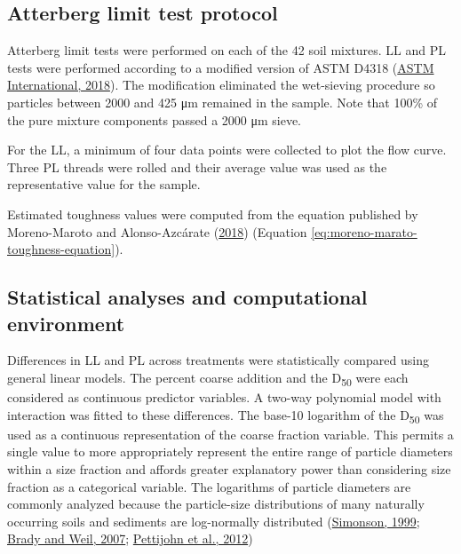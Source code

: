 \documentclass[
  letterpaper,
]{article}
\begin{document}
\hypertarget{atterberg-limit-test-protocol}{%
\subsection{Atterberg limit test protocol}\label{atterberg-limit-test-protocol}}

Atterberg limit tests were performed on each of the 42 soil mixtures.
LL and PL tests were performed according to a modified version of ASTM D4318 (\protect\hyperlink{ref-ASTMD43182018}{ASTM International, 2018}).
The modification eliminated the wet-sieving procedure so particles between 2000 and 425 μm remained in the sample.
Note that 100\% of the pure mixture components passed a 2000 μm sieve.

For the LL, a minimum of four data points were collected to plot the flow curve.
Three PL threads were rolled and their average value was used as the representative value for the sample.

Estimated toughness values were computed from the equation published by Moreno-Maroto and Alonso-Azcárate (\protect\hyperlink{ref-Moreno-Maroto2018}{2018}) (Equation \eqref{eq:moreno-marato-toughness-equation}).

\hypertarget{statistical-analyses-and-computational-environment}{%
\subsection{Statistical analyses and computational environment}\label{statistical-analyses-and-computational-environment}}

Differences in LL and PL across treatments were statistically compared using general linear models.
The percent coarse addition and the D\textsubscript{50} were each considered as continuous predictor variables.
A two-way polynomial model with interaction was fitted to these differences.
The base-10 logarithm of the D\textsubscript{50} was used as a continuous representation of the coarse fraction variable.
This permits a single value to more appropriately represent the entire range of particle diameters within a size fraction and affords greater explanatory power than considering size fraction as a categorical variable.
The logarithms of particle diameters are commonly analyzed because the particle-size distributions of many naturally occurring soils and sediments are log-normally distributed (\protect\hyperlink{ref-Simonson1999}{Simonson, 1999}; \protect\hyperlink{ref-Brady2007}{Brady and Weil, 2007}; \protect\hyperlink{ref-Pettijohn2012}{Pettijohn et al., 2012})
\end{document}
